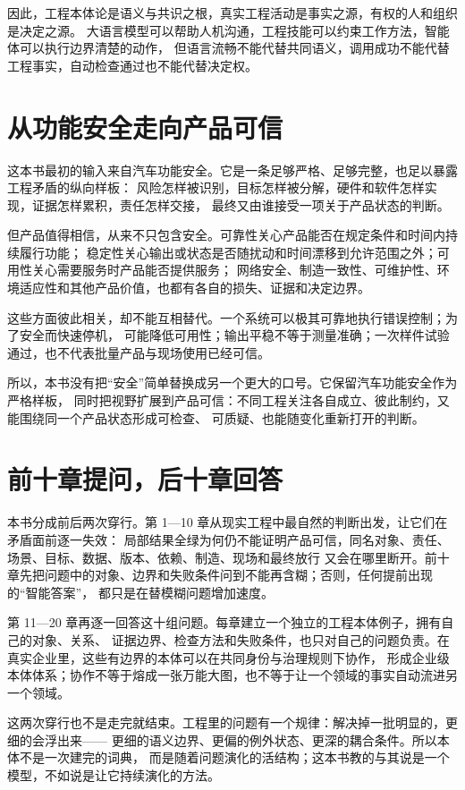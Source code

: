 因此，工程本体论是语义与共识之根，真实工程活动是事实之源，有权的人和组织是决定之源。
大语言模型可以帮助人机沟通，工程技能可以约束工作方法，智能体可以执行边界清楚的动作，
但语言流畅不能代替共同语义，调用成功不能代替工程事实，自动检查通过也不能代替决定权。

\section*{从功能安全走向产品可信}

这本书最初的输入来自汽车功能安全。它是一条足够严格、足够完整，也足以暴露工程矛盾的纵向样板：
风险怎样被识别，目标怎样被分解，硬件和软件怎样实现，证据怎样累积，责任怎样交接，
最终又由谁接受一项关于产品状态的判断。

但产品值得相信，从来不只包含安全。可靠性关心产品能否在规定条件和时间内持续履行功能；
稳定性关心输出或状态是否随扰动和时间漂移到允许范围之外；可用性关心需要服务时产品能否提供服务；
网络安全、制造一致性、可维护性、环境适应性和其他产品价值，也都有各自的损失、证据和决定边界。

这些方面彼此相关，却不能互相替代。一个系统可以极其可靠地执行错误控制；为了安全而快速停机，
可能降低可用性；输出平稳不等于测量准确；一次样件试验通过，也不代表批量产品与现场使用已经可信。

所以，本书没有把“安全”简单替换成另一个更大的口号。它保留汽车功能安全作为严格样板，
同时把视野扩展到产品可信：不同工程关注各自成立、彼此制约，又能围绕同一个产品状态形成可检查、
可质疑、也能随变化重新打开的判断。

\section*{前十章提问，后十章回答}

本书分成前后两次穿行。第 1—10 章从现实工程中最自然的判断出发，让它们在矛盾面前逐一失效：
局部结果全绿为何仍不能证明产品可信，同名对象、责任、场景、目标、数据、版本、依赖、制造、现场和最终放行
又会在哪里断开。前十章先把问题中的对象、边界和失败条件问到不能再含糊；否则，任何提前出现的“智能答案”，
都只是在替模糊问题增加速度。

第 11—20 章再逐一回答这十组问题。每章建立一个独立的工程本体例子，拥有自己的对象、关系、
证据边界、检查方法和失败条件，也只对自己的问题负责。在真实企业里，这些有边界的本体可以在共同身份与治理规则下协作，
形成企业级本体体系；协作不等于熔成一张万能大图，也不等于让一个领域的事实自动流进另一个领域。

这两次穿行也不是走完就结束。工程里的问题有一个规律：解决掉一批明显的，更细的会浮出来——
更细的语义边界、更偏的例外状态、更深的耦合条件。所以本体不是一次建完的词典，
而是随着问题演化的活结构；这本书教的与其说是一个模型，不如说是让它持续演化的方法。

